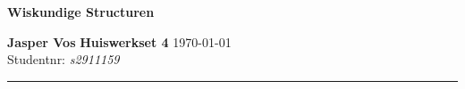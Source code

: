 \documentclass{article}
\begin{document}
{\Large \textbf{Wiskundige Structuren}}

\bigskip

\textbf{Jasper Vos} \hfill \textbf{Huiswerkset 4} \hfill \today \\
Studentnr: \emph{s2911159}

\rule{\textwidth}{2pt}

\bigskip

\newtheorem{lemma}{Lemma}

\newcommand{\N}{\mathbb{N}}
\newcommand{\f}[2]{\frac{#1}{#2}}
\newcommand{\tx}[1]{\text{#1}}
\newcommand{\cn}[1]{\cancel{#1}}
\newcommand{\Z}{\mathbb{Z}}
\newcommand{\R}{\mathbb{R}}
\newcommand{\Rho}{\mathcal{P}}
\newcommand{\en}{\tx{ en }}
\newcommand{\of}{\tx{ of }}
\newcommand{\geldt}{\tx{ geldt }}
\newcommand{\dan}{\tx{ dan }}
\newcommand{\als}{\tx{ als }}
\newcommand{\zdd}{\tx{ zodanig dat }}
\end{document}
